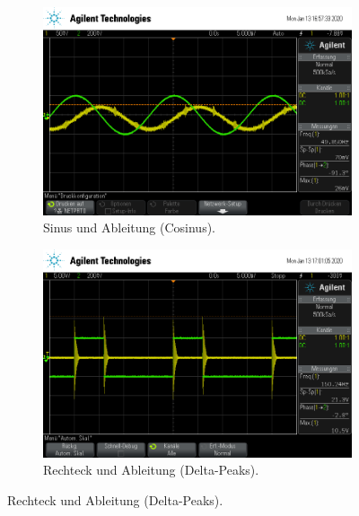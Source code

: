                 \begin{figure}
                    \centering
                    \begin{subfigure}{0.48\textwidth}
                        \centering
                        \includegraphics[width=\textwidth]{scope_0.png}%
                        \caption{Sinus und Ableitung (Cosinus).}
                        \label{fig:TU}
                    \end{subfigure}
                    \begin{subfigure}{0.48\textwidth}
                        \centering
                        \includegraphics[width=\textwidth]{scope_2.png}%
                        \caption{Rechteck und Ableitung (Delta-Peaks).}
                        \label{fig:TU}

\end{subfigure}
\end{figure}
